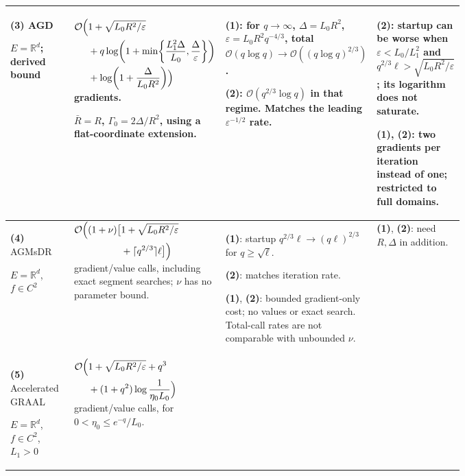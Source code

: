 \begin{table}[tp]
\begin{threeparttable}
\begin{tabularx}{\linewidth}{@{}>{\raggedright\arraybackslash}p{0.20\linewidth}>{\raggedright\arraybackslash}p{0.32\linewidth}>{\raggedright\arraybackslash}p{0.25\linewidth}>{\raggedright\arraybackslash}X@{}}
\midrule[1.2pt]
\textbf{(3)} AGD \citep[Theorem~4.3, v2]{cgsTyurin2026v2}\par $E=\mathbb R^d$; derived bound
& $\begin{aligned}[t]\mathcal{O}\Bigl(&1+\sqrt{L_0R^2/\varepsilon}\\ &+q\log\!\left(1+\min\!\left\{\frac{L_1^2\Delta}{L_0},\frac{\Delta}{\varepsilon}\right\}\right)\\ &+\log\!\left(1+\frac{\Delta}{L_0R^2}\right)\Bigr)\end{aligned}$ gradients.\par $\bar R=R$, $\Gamma_0=2\Delta/R^2$, using a flat-coordinate extension.
& \textbf{(1)}: for $q\to\infty$, $\Delta=L_0R^2$, $\varepsilon=L_0R^2q^{-4/3}$, total $\mathcal{O}(q\log q)\to\mathcal{O}((q\log q)^{2/3})$.\par \textbf{(2)}: $\mathcal{O}(q^{2/3}\log q)$ in that regime. Matches the leading $\varepsilon^{-1/2}$ rate.
& \textbf{(2)}: startup can be worse when $\varepsilon<L_0/L_1^2$ and $q^{2/3}\ell>\sqrt{L_0R^2/\varepsilon}$; its logarithm does not saturate.\par \textbf{(1)}, \textbf{(2)}: two gradients per iteration instead of one; restricted to full domains. \\
\midrule
\textbf{(4)} AGMsDR \citep[Theorem~6.2, v3]{gscVankov2025v3}\par $E=\mathbb R^d$, $f\in C^2$
& $\begin{aligned}[t]\mathcal{O}\Bigl((1+\nu)\bigl[&1+\sqrt{L_0R^2/\varepsilon}\\ &+\lceil q^{2/3}\rceil\ell\bigr]\Bigr)\end{aligned}$ gradient/value calls, including exact segment searches; $\nu$ has no parameter bound.
& \textbf{(1)}: startup $q^{2/3}\ell\to(q\ell)^{2/3}$ for $q\ge\sqrt\ell$.\par \textbf{(2)}: matches iteration rate.\par \textbf{(1)}, \textbf{(2)}: bounded gradient-only cost; no values or exact search. Total-call rates are not comparable with unbounded $\nu$.
& \textbf{(1)}, \textbf{(2)}: need $R,\Delta$ in addition. \\
\midrule
\textbf{(5)} Accelerated GRAAL \citep[Corollary~3, v2]{gscBorodichKovalev2025v2}\par $E=\mathbb R^d$, $f\in C^2$, $L_1>0$
& $\begin{aligned}[t]\mathcal{O}\Bigl(&1+\sqrt{L_0R^2/\varepsilon}+q^3\\ &+(1+q^2)\log\frac1{\eta_0L_0}\Bigr)\end{aligned}$ gradient/value calls, for $0<\eta_0\le e^{-q}/L_0$.

\end{tabularx}
\end{threeparttable}
\end{table}
